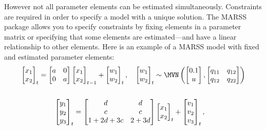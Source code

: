 However not all parameter elements can be estimated simultaneously. Constraints are required in order to specify a model with a unique solution. The MARSS package allows you to specify constraints by fixing elements in a parameter matrix or specifying that some elements are estimated---and have a linear relationship to other elements. Here is an example of a MARSS model with fixed and estimated parameter elements:
\begin{gather*}
\begin{bmatrix}x_1\\ x_2\end{bmatrix}_t
= \begin{bmatrix}a&0\\0&a\end{bmatrix}
\begin{bmatrix}x_1\\x_2\end{bmatrix}_{t-1}
+ \begin{bmatrix}w_1\\ w_2\end{bmatrix}_t,\quad 
\begin{bmatrix}w_1\\ w_2\end{bmatrix}_t \sim \MVN\begin{pmatrix}\begin{bmatrix}0.1\\u\end{bmatrix},\begin{bmatrix}q_{11}&q_{12}\\q_{12}&q_{22}\end{bmatrix} \end{pmatrix}  \\
\\
\begin{bmatrix}y_1\\ y_2\\ y_3\end{bmatrix}_t
= \begin{bmatrix}d&d\\ c& c\\ 1+2d+3c&2+3d\end{bmatrix}
\begin{bmatrix}x_1\\ x_2\end{bmatrix}_t
+ \begin{bmatrix}v_1\\ v_2\\ v_3\end{bmatrix}_t,\quad

\end{gather*}
